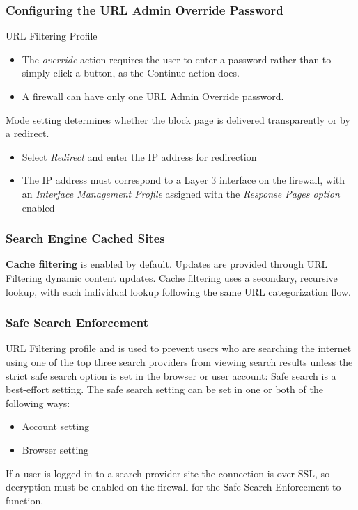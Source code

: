 \subsubsection{Configuring the URL Admin Override Password}
URL Filtering Profile
\begin{itemize}
    \item The \textit{override} action requires the user to enter a password rather than to simply click a button, as the Continue action does.
    \item A firewall can have only one URL Admin Override password.
\end{itemize}
Mode setting determines whether the block page is delivered transparently or by a redirect.
\begin{itemize}
    \item Select \textit{Redirect} and enter the IP address for redirection
    \item The IP address must correspond to a Layer 3 interface on the firewall, with an \textit{Interface Management Profile} assigned with the \textit{Response Pages option} enabled
\end{itemize}

\subsubsection{Search Engine Cached Sites}
\textbf{Cache filtering} is enabled by default. Updates are provided through URL Filtering dynamic content updates. Cache filtering uses a secondary, recursive lookup, with each individual lookup following the same URL categorization flow.
\subsubsection{Safe Search Enforcement}
URL Filtering profile and is used to prevent users who are searching the internet using one of the top three search providers from viewing search results unless the strict safe search option is set in the browser or user account:
Safe search is a best-effort setting. The safe search setting can be set in one or both of the following ways:
\begin{itemize}
    \item Account setting
    \item Browser setting
\end{itemize}
 If a user is logged in to a search provider site the connection is over SSL, so decryption must be enabled on the firewall for the Safe Search Enforcement to function.

